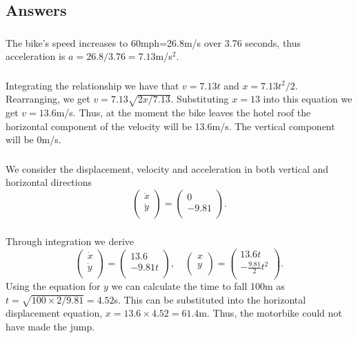 \documentclass[10pt]{article}
\newcommand{\bb}{\begin{equation}}
\newcommand{\ee}{\end{equation}}
\begin{document}
\begin{Answ}
\subsection{Answers}
\subsubsection{}
The bike's speed increases to 60mph=26.8m/s over 3.76 seconds, thus acceleration is $a=26.8/3.76=7.13$m/s$^2$.
\subsubsection{}
Integrating the relationship we have that $v=7.13t$ and $x=7.13t^2/2$. Rearranging, we get $v=7.13\sqrt{2x/7.13}$. Substituting $x=13$ into this equation we get $v=13.6$m/s. Thus, at the moment the bike leaves the hotel roof the horizontal component of the velocity will be 13.6m/s. The vertical component will be 0m/s.
\subsubsection{}
We consider the displacement, velocity and acceleration in both vertical and horizontal directions
\bb
\left(
\begin{array}{c}
\ddot{x}\\
\ddot{y}\\
\end{array}
\right)=\left(
\begin{array}{c}
0\\
-9.81\\
\end{array}
\right).
\ee
\subsubsection{}
Through integration we derive
\bb
\left(
\begin{array}{c}
\dot{x}\\
\dot{y}\\
\end{array}
\right)=\left(
\begin{array}{c}
13.6\\
-9.81t\\
\end{array}
\right), \quad \left(
\begin{array}{c}
x\\
y\\
\end{array}
\right)=\left(
\begin{array}{c}
13.6t\\
-\frac{9.81}{2}t^2\\
\end{array}
\right).
\ee
Using the equation for $y$ we can calculate the time to fall 100m as $t=\sqrt{100\times 2/9.81}=4.52$s. This can be substituted into the horizontal displacement equation, $x=13.6 \times 4.52=61.4$m. Thus, the motorbike could not have made the jump.

\end{Answ}
\end{document}
